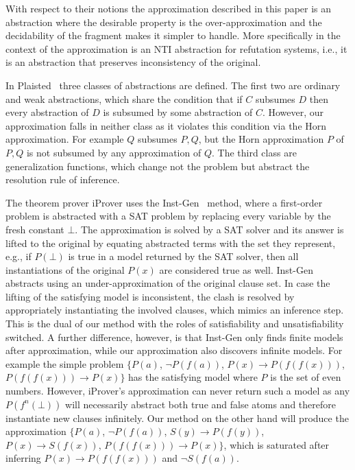 \documentclass{llncs}
\newcommand{\imp}{\rightarrow}
\begin{document}
With respect to their notions the approximation described in this paper is an abstraction where the desirable property is the over-approximation and the decidability of the fragment makes it simpler to handle. More specifically in the context of \cite{Giunchiglia:1992:TA:146945.146951} the approximation is an NTI abstraction for refutation systems, i.e., it is an abstraction that preserves inconsistency of the original. 

In  Plaisted~\cite{journals/ai/Plaisted81} three classes of abstractions are defined. The first two are ordinary and weak abstractions, which share the condition that if $C$ subsumes $D$ then every abstraction of $D$ is subsumed by some abstraction of $C$. However, our approximation falls in neither class as it violates this condition via the Horn approximation. For example $Q$ subsumes $P, Q$, but the Horn 
approximation $P$ of $P, Q$ is not subsumed by any approximation of $Q$.    
The third class are generalization functions, which change not the problem but abstract the resolution rule of inference. 

The theorem prover iProver uses the Inst-Gen~\cite{DBLP:conf/birthday/Korovin13} method, 
where a first-order problem is abstracted with a SAT problem by replacing every variable by the fresh constant $\bot$. 
The approximation is solved by a SAT solver and its answer is lifted to the original 
by equating abstracted terms with the set they represent, e.g., if $P(\bot)$ is true in a
 model returned by the SAT solver, then all instantiations of the original $P(x)$ are 
considered true as well. 
Inst-Gen abstracts using an  under-approximation of the original clause set.
In case the lifting of the satisfying model is inconsistent, 
the clash is resolved by appropriately instantiating the involved clauses, which mimics an inference step.
This is the dual of our method with the roles of satisfiability and unsatisfiability switched.
A further difference, however, is that Inst-Gen only finds finite models after approximation, 
while our approximation also discovers infinite models.
For example the simple problem $\{ P(a)$, $\neg P(f(a))$, $P(x) \imp P(f(f(x)))$, $P(f(f(x))) \imp P(x)\}$ has the satisfying model where $P$ is the set of even numbers.
However, iProver's approximation can never return such a model as any $P(f^n(\bot))$ will necessarily abstract both true and false atoms and therefore instantiate new clauses infinitely. 
Our method on the other hand will produce the approximation $\{P(a)$, $\neg P(f(a))$, $S(y) \imp P(f(y))$,  $P(x) \imp S(f(x))$,  $P(f(f(x))) \imp P(x)\}$, which  is saturated after inferring $P(x) \imp P(f(f(x)))$ and $\neg S(f(a))$.
\end{document}
